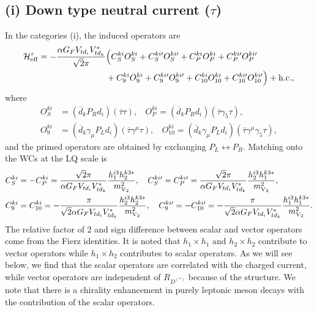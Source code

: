 \documentclass[12pt, a4paper]{article}
\numberwithin{equation}{section} %
\newcommand{\ov}{\overline}
\newcommand{\1}{\mbox{1}\hspace{-0.25em}\mbox{l}}
\begin{document}
\subsection*{(i) Down type neutral current ($\tau$)}
In the categories (i), the induced operators are 
\begin{align}
\mathcal{H}_{\rm eff}^{\tau} =-\frac{\alpha G_F V_{td_i}V_{td_k}^*}{\sqrt{2}\pi}& \Big ( C_S^{ki}O_S^{ki} + C_S^{ki \prime}O_S^{ki \prime }+C_P^{ki}O_P^{ki} + C_P^{ki \prime}O_P^{ki\prime}  \nonumber \\
& +C_9^{ki}O_9^{ki} + C_9^{ki \prime}O_9^{ki \prime }+C_{10}^{ki}O_{10}^{ki} + C_{10}^{ki \prime}O_{10}^{ki\prime} \Big ) +{\rm{h.c.,}}
\end{align}
where  
\begin{align}
O_S^{ki}&=(\ov{d}_k P_R d_i)(\ov{\tau} \tau),~~~~O_{P}^{ki}=(\ov{d}_k P_R d_i)(\ov{\tau} \gamma_5\tau),\nonumber\\
O_9^{ki}&=(\ov{d}_k\gamma_\mu P_L d_i)(\ov{\tau}\gamma^\mu \tau), ~~~~O_{10}^{ki}=(\ov{d}_k \gamma_\mu P_L d_i)(\ov{\tau}\gamma^\mu \gamma_5\tau),
\label{eq:ND_SL_ope}
\end{align}
and the primed operators are obtained by exchanging $P_L\leftrightarrow P_R$.
Matching onto the WCs at the LQ scale is
\begin{align}
C_S^{ki}&=-C_P^{ki}=\frac{\sqrt{2} \pi }{\alpha G_F V_{td_i} V_{td_k}^* }\frac{h_1^{i3}h_2^{k3*}}{m_{\rm{V}_2}^2},~~~
C_S^{ki\prime}=C_P^{ki\prime}=\frac{\sqrt{2} \pi }{\alpha G_F V_{td_i} V_{td_k}^* }\frac{h_2^{i3}h_1^{k3*}}{m_{\rm{V}_2}^2},\nonumber\\
C_9^{ki}&=C_{10}^{ki}=-\frac{ \pi }{\sqrt{2}\alpha G_F V_{td_i} V_{td_k}^* }\frac{h_2^{i3}h_2^{k3*}}{m_{\rm{V}_2}^2},~~~
C_9^{ki\prime}=-C_{10}^{ki\prime}=-\frac{ \pi }{\sqrt{2}\alpha G_F V_{td_i} V_{td_k}^* }\frac{h_1^{i3}h_1^{k3*}}{m_{\rm{V}_2}^2}.
\label{eq:ND_SL_ope2}
\end{align}
The relative factor of 2 and sign difference between scalar and vector operators come from the Fierz identities. 
It is noted that $h_1\times h_1$ and $h_2\times h_2$ contribute to vector operators while $h_1\times h_2$ contributes to scalar operators. As we will see below, we find that the scalar operators are correlated with the charged current, while vector operators are independent of $R_{D^{(*)}}$ because of the structure.
We note that there is a chirality enhancement in purely leptonic meson decays with the contribution of the scalar operators.
\end{document}
